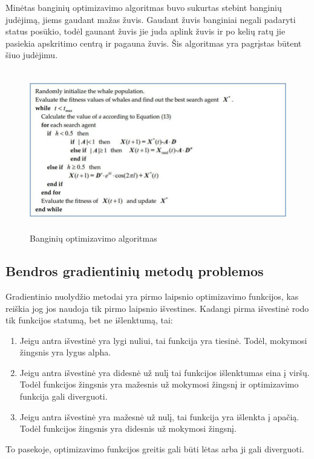 \documentclass{VUMIFInfKursinis}
\begin{document}
\par
Minėtas banginių optimizavimo algoritmas buvo sukurtas stebint banginių judėjimą, jiems gaudant mažas žuvis. Gaudant žuvis banginiai negali
padaryti status posūkio, todėl gaunant žuvis jie juda aplink žuvis ir po kelių ratų jie pasiekia apskritimo
centrą ir pagauna žuvis. Šis algoritmas yra pagrįstas būtent šiuo judėjimu. \cite{salt10}
\begin{figure}[ht]
  \centering
  \includegraphics[width=12cm,height=7cm,keepaspectratio]{what_alg.png}
  \caption{Banginių optimizavimo algoritmas \cite{salt10}}
  \label{fig:lygtis1}
\end{figure}







\subsection{Bendros gradientinių metodų problemos}
\par
Gradientinio nuolydžio metodai yra pirmo laipsnio optimizavimo funkcijos, kas
reiškia jog jos naudoja tik pirmo laipsnio išvestines. Kadangi pirma išvestinė rodo
tik funkcijos statumą, bet ne išlenktumą, tai:
\begin{enumerate}
\item Jeigu antra išvestinė yra lygi nuliui, tai funkcija yra tiesinė. Todėl,
mokymosi žingsnis yra lygus alpha. \cite{salt9}
\item Jeigu antra išvestinė yra didesnė už nulį tai funkcijos išlenktumas eina į viršų.
Todėl funkcijos žingsnis yra mažesnis už mokymosi žingsnį ir optimizavimo funkcija gali
diverguoti. \cite{salt9}
\item Jeigu antra išvestinė yra mažesnė už nulį, tai funkcija yra išlenkta į apačią.
Todėl funkcijos žingsnis yra didesnis už mokymosi žingsnį. \cite{salt9}
\end{enumerate}
\par
To pasekoje, optimizavimo funkcijos greitis gali būti lėtas arba ji gali diverguoti.
\end{document}
